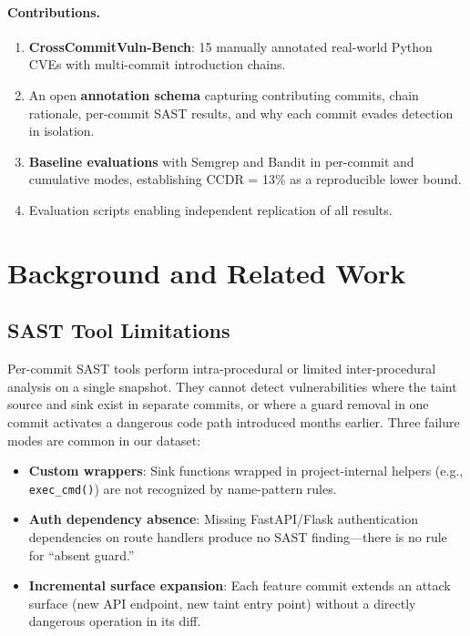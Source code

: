 \documentclass[sigconf,review]{acmart}
\newcommand{\NUMCVES}{15}
\newcommand{\CCDR}{13\%}                %
\begin{document}
\paragraph{Contributions.}
\begin{enumerate}
  \item \textbf{CrossCommitVuln-Bench}: \NUMCVES{} manually annotated real-world Python CVEs
        with multi-commit introduction chains.
  \item An open \textbf{annotation schema} capturing contributing commits, chain rationale,
        per-commit SAST results, and why each commit evades detection in isolation.
  \item \textbf{Baseline evaluations} with Semgrep and Bandit in per-commit and cumulative modes,
        establishing CCDR = \CCDR{} as a reproducible lower bound.
  \item Evaluation scripts enabling independent replication of all results.
\end{enumerate}

\section{Background and Related Work}

\subsection{SAST Tool Limitations}

Per-commit SAST tools perform intra-procedural or limited inter-procedural analysis on a
single snapshot. They cannot detect vulnerabilities where the taint source and sink exist
in separate commits, or where a guard removal in one commit activates a dangerous code path
introduced months earlier. Three failure modes are common in our dataset:

\begin{itemize}
  \item \textbf{Custom wrappers}: Sink functions wrapped in project-internal helpers
        (e.g., \texttt{exec\_cmd()}) are not recognized by name-pattern rules.
  \item \textbf{Auth dependency absence}: Missing FastAPI/Flask authentication dependencies
        on route handlers produce no SAST finding—there is no rule for ``absent guard.''
  \item \textbf{Incremental surface expansion}: Each feature commit extends an attack surface
        (new API endpoint, new taint entry point) without a directly dangerous operation in its diff.
\end{itemize}
\end{document}
